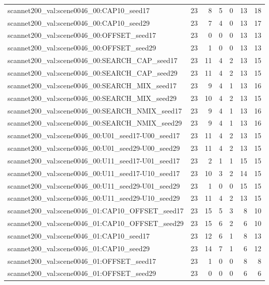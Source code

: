 \begin{table}[t]
\begin{tabular}{lrrrrrr}
scannet200\_val:scene0046\_00:CAP10\_seed17 & 23 & 8 & 5 & 0 & 13 & 18 \\
scannet200\_val:scene0046\_00:CAP10\_seed29 & 23 & 7 & 4 & 0 & 13 & 17 \\
scannet200\_val:scene0046\_00:OFFSET\_seed17 & 23 & 0 & 0 & 0 & 13 & 13 \\
scannet200\_val:scene0046\_00:OFFSET\_seed29 & 23 & 1 & 0 & 0 & 13 & 13 \\
scannet200\_val:scene0046\_00:SEARCH\_CAP\_seed17 & 23 & 11 & 4 & 2 & 13 & 15 \\
scannet200\_val:scene0046\_00:SEARCH\_CAP\_seed29 & 23 & 11 & 4 & 2 & 13 & 15 \\
scannet200\_val:scene0046\_00:SEARCH\_MIX\_seed17 & 23 & 9 & 4 & 1 & 13 & 16 \\
scannet200\_val:scene0046\_00:SEARCH\_MIX\_seed29 & 23 & 10 & 4 & 2 & 13 & 15 \\
scannet200\_val:scene0046\_00:SEARCH\_NMIX\_seed17 & 23 & 9 & 4 & 1 & 13 & 16 \\
scannet200\_val:scene0046\_00:SEARCH\_NMIX\_seed29 & 23 & 9 & 4 & 1 & 13 & 16 \\
scannet200\_val:scene0046\_00:U01\_seed17-U00\_seed17 & 23 & 11 & 4 & 2 & 13 & 15 \\
scannet200\_val:scene0046\_00:U01\_seed29-U00\_seed29 & 23 & 11 & 4 & 2 & 13 & 15 \\
scannet200\_val:scene0046\_00:U11\_seed17-U01\_seed17 & 23 & 2 & 1 & 1 & 15 & 15 \\
scannet200\_val:scene0046\_00:U11\_seed17-U10\_seed17 & 23 & 10 & 3 & 2 & 14 & 15 \\
scannet200\_val:scene0046\_00:U11\_seed29-U01\_seed29 & 23 & 1 & 0 & 0 & 15 & 15 \\
scannet200\_val:scene0046\_00:U11\_seed29-U10\_seed29 & 23 & 11 & 4 & 2 & 13 & 15 \\
scannet200\_val:scene0046\_01:CAP10\_OFFSET\_seed17 & 23 & 15 & 5 & 3 & 8 & 10 \\
scannet200\_val:scene0046\_01:CAP10\_OFFSET\_seed29 & 23 & 15 & 6 & 2 & 6 & 10 \\
scannet200\_val:scene0046\_01:CAP10\_seed17 & 23 & 12 & 6 & 1 & 8 & 13 \\
scannet200\_val:scene0046\_01:CAP10\_seed29 & 23 & 14 & 7 & 1 & 6 & 12 \\
scannet200\_val:scene0046\_01:OFFSET\_seed17 & 23 & 1 & 0 & 0 & 8 & 8 \\
scannet200\_val:scene0046\_01:OFFSET\_seed29 & 23 & 0 & 0 & 0 & 6 & 6 \\

\end{tabular}
\end{table}
